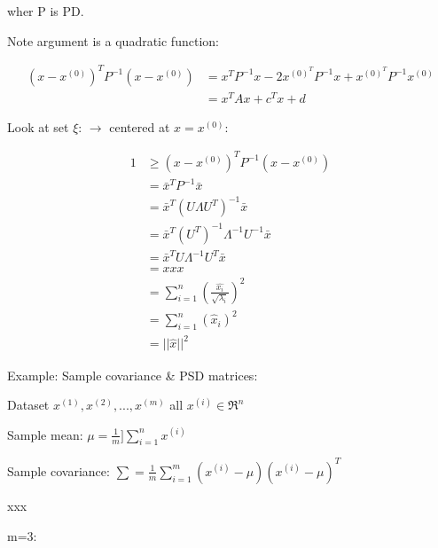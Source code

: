 wher P is PD.

Note argument is a quadratic function:

\begin{align*}
(x - x^{(0)})^TP^{-1}(x - x^{(0)}) &= x^TP^{-1}x - 2x^{(0)^T}P^{-1}x + x^{(0)^T}P^{-1}x^{(0)}\\
&= x^TAx + c^Tx + d
\end{align*}

Look at set $\xi$: $\rightarrow$ centered at $x = x^{(0)}$:

\begin{align*}
1 &\geq (x - x^{(0)})^TP^{-1}(x - x^{(0)})\\
&= \bar{x}^TP^{-1}\bar{x}\\
&= \bar{x}^T(U\Lambda U^T)^{-1}\bar{x}\\
&= \bar{x}^T(U^T)^{-1}\Lambda^{-1}U^{-1}\bar{x}\\
&= \bar{x}^TU\Lambda^{-1}U^T\bar{x}\\
&= xxx\\
&= \sum^n_{i=1}(\frac{\hat{x_i}}{\sqrt{\lambda_i}})^2\\
&= \sum^n_{i=1}(\hat{x}_i)^2\\
&= ||\hat{x}||^2
\end{align*}



Example: Sample covariance \& PSD matrices: 

Dataset $x^{(1)}, x^{(2)}, ..., x^{(m)}$ all $x^{(i)}\in \Re^n$

Sample mean: $\mu = \frac{1}{m}]\sum^n_{i=1}x^{(i)}$

Sample covariance: $\sum = \frac{1}{m}\sum^m_{i=1}(x^{(i)}-\mu)(x^{(i)}-\mu)^T$

xxx

m=3:

